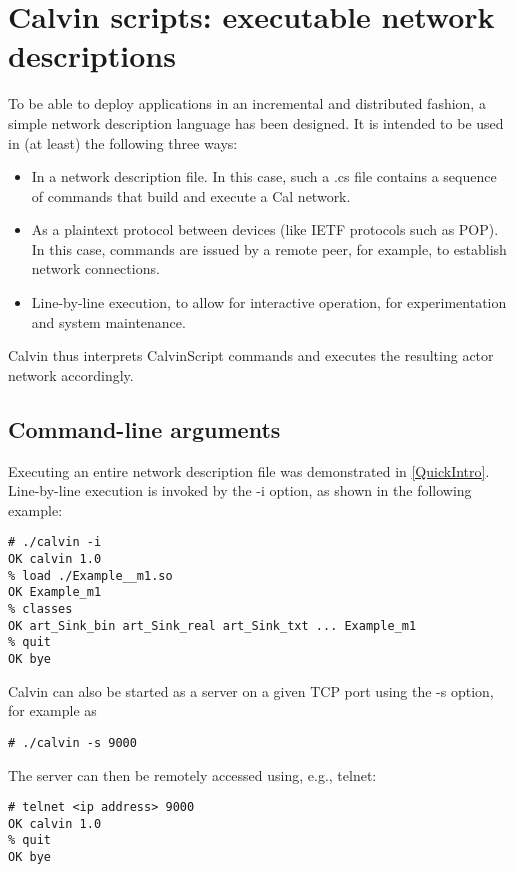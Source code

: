\documentclass[10pt, a4paper]{article}
\begin{document}
\section{Calvin scripts: executable network descriptions}
\label{CalvinScript}

To be able to deploy applications in an incremental and
distributed fashion, a simple network description language has been
designed. It is intended to be used in (at least) the following three
ways:

\begin{itemize}
\item In a network description file. In this case, such a .cs file
  contains a sequence of commands that build and execute a Cal
  network.
\item As a plaintext protocol between devices (like IETF protocols
  such as POP). In this case, commands are issued by a remote peer,
  for example, to establish network connections.
\item Line-by-line execution, to allow for interactive operation, for
  experimentation and system maintenance.
\end{itemize}

Calvin thus interprets CalvinScript commands and executes the
resulting actor network accordingly.

\subsection{Command-line arguments}

Executing an entire network description file was demonstrated in
\ref{QuickIntro}. Line-by-line execution is invoked by the -i option, as
shown in the following example:

\begin{verbatim}
# ./calvin -i
OK calvin 1.0
% load ./Example__m1.so
OK Example_m1
% classes
OK art_Sink_bin art_Sink_real art_Sink_txt ... Example_m1
% quit
OK bye
\end{verbatim}

Calvin can also be started as a server on a given TCP port using the -s option, for example as

\begin{verbatim}
# ./calvin -s 9000
\end{verbatim}

The server can then be remotely accessed using, e.g., telnet:

\begin{verbatim}
# telnet <ip address> 9000
OK calvin 1.0
% quit
OK bye
\end{verbatim}
\end{document}
